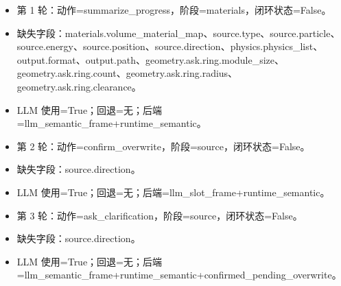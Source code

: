 \documentclass[11pt]{ctexart}
\begin{document}
\begin{itemize}
\item 第 1 轮：动作=summarize\_progress，阶段=materials，闭环状态=False。
\item 缺失字段：materials.volume\_material\_map、source.type、source.particle、source.energy、source.position、source.direction、physics.physics\_list、output.format、output.path、geometry.ask.ring.module\_size、geometry.ask.ring.count、geometry.ask.ring.radius、geometry.ask.ring.clearance。
\item LLM 使用=True；回退=无；后端=llm\_semantic\_frame+runtime\_semantic。
\item 第 2 轮：动作=confirm\_overwrite，阶段=source，闭环状态=False。
\item 缺失字段：source.direction。
\item LLM 使用=True；回退=无；后端=llm\_slot\_frame+runtime\_semantic。
\item 第 3 轮：动作=ask\_clarification，阶段=source，闭环状态=False。
\item 缺失字段：source.direction。
\item LLM 使用=True；回退=无；后端=llm\_semantic\_frame+runtime\_semantic+confirmed\_pending\_overwrite。
\end{itemize}
\end{document}
